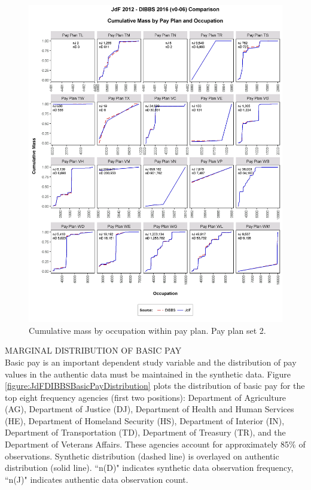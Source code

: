 \documentclass[10pt, letterpaper]{article}
\begin{document}
\begin{spacing}{1.0}
\begin{figure}[h!]
    \centering
    \includegraphics[width=5.9in, trim={0 0 0 0.75in}, clip]{CMFOccupationPayPlan141.png}
    \caption{Cumulative mass by occupation within pay plan.  Pay plan set 2.}
    \label{figure:CMFOccupationPayPlan2}
\end{figure}

\clearpage

MARGINAL DISTRIBUTION OF BASIC PAY\\

Basic pay is an important dependent study variable and the distribution of pay values in the authentic data must be maintained in the synthetic data.  Figure \ref{figure:JdFDIBBSBasicPayDistribution} plots the distribution of basic pay for the top eight frequency agencies (first two positions):  Department of Agriculture (AG), Department of Justice (DJ), Department of Health and Human Services (HE), Department of Homeland Security (HS), Department of Interior (IN), Department of Transportation (TD), Department of Treasury (TR), and the Department of Veterans Affairs.  These agencies account for approximately 85\% of observations.  Synthetic distribution (dashed line)  is overlayed on authentic distribution (solid line).  ``n(D)" indicates synthetic data observation frequency, ``n(J)" indicates authentic data observation count.\\


\end{spacing}
\end{document}
